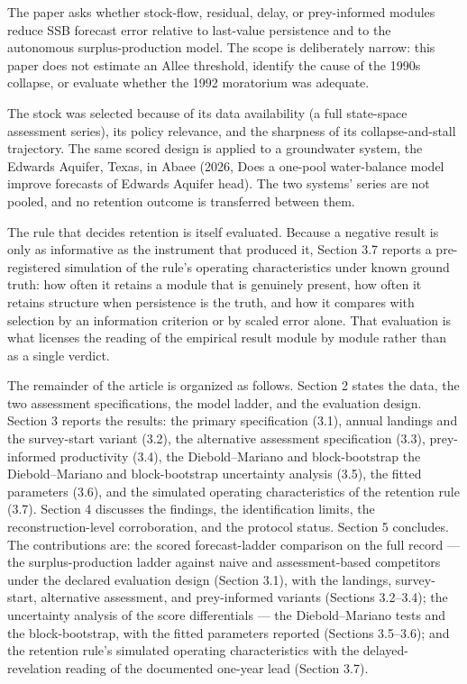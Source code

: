 \documentclass[11pt]{article}
\begin{document}
The paper asks whether stock-flow, residual, delay, or prey-informed
modules reduce SSB forecast error relative to last-value persistence and
to the autonomous surplus-production model. The scope is deliberately
narrow: this paper does not estimate an Allee threshold, identify the
cause of the 1990s collapse, or evaluate whether the 1992 moratorium was
adequate.

The stock was selected because of its data availability (a full
state-space assessment series), its policy relevance, and the sharpness
of its collapse-and-stall trajectory. The same scored design is applied to a groundwater system, the Edwards
Aquifer, Texas, in Abaee (2026, Does a one-pool water-balance model improve forecasts of Edwards Aquifer head). The two systems' series are not
pooled, and no retention outcome is transferred between them.

The rule that decides retention is itself evaluated. Because a negative
result is only as informative as the instrument that produced it,
Section 3.7 reports a pre-registered simulation of the rule's operating
characteristics under known ground truth: how often it retains a module
that is genuinely present, how often it retains structure when
persistence is the truth, and how it compares with selection by an
information criterion or by scaled error alone. That evaluation is what
licenses the reading of the empirical result module by module rather
than as a single verdict.

The remainder of the article is organized as follows. Section 2 states
the data, the two assessment specifications, the model ladder, and the
evaluation design. Section 3 reports the results: the primary
specification (3.1), annual landings and the survey-start variant (3.2),
the alternative assessment specification (3.3), prey-informed
productivity (3.4), the Diebold--Mariano and block-bootstrap
the Diebold--Mariano and block-bootstrap uncertainty analysis (3.5),
the fitted parameters (3.6), and the simulated operating characteristics
of the retention rule (3.7).
Section 4 discusses the findings, the identification limits, the
reconstruction-level corroboration, and the protocol status.
Section 5 concludes. The contributions are: the scored forecast-ladder
comparison on the full record --- the surplus-production ladder against
naive and assessment-based competitors under the declared evaluation
design (Section 3.1), with the landings, survey-start, alternative
assessment, and prey-informed variants (Sections 3.2--3.4); the
uncertainty analysis of the score differentials --- the
Diebold--Mariano tests and the block-bootstrap, with the fitted
parameters reported (Sections 3.5--3.6); and the retention rule's
simulated operating characteristics with the delayed-revelation reading
of the documented one-year lead (Section 3.7).
\end{document}
